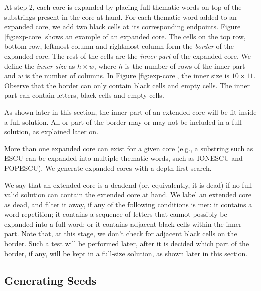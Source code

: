 At step 2, each core is expanded by placing full thematic words on top of the substrings present in the core at hand.
For each thematic word added to an expanded core, we add two black cells at its corresponding endpoints.
Figure \ref{fig:exp-core} shows an example of an expanded core. 
The cells on the top row, bottom row, leftmost column and rightmost column form the \emph{border} of the expanded core. The rest of the cells are the \emph{inner part} of the expanded core.
We define the \emph{inner size} as $h \times w$, where $h$ is the number of rows
of the inner part and $w$ is the number of columns.
In Figure \ref{fig:exp-core}, the inner size is $10 \times 11$.
Observe that the border can only contain black cells and empty cells.
The inner part can contain letters, black cells and empty cells.

As shown later in this section, the inner part of an extended core will be fit inside a full solution.
All or part of the border may or may not be included in a full solution, as explained later on.

More than one expanded core can exist for a given core (e.g., a substring such as ESCU can be expanded into multiple thematic words, such as IONESCU and POPESCU).
We generate expanded cores with a depth-first search.

We say that an extended core is a deadend (or, equivalently, it is dead) if no full valid solution can contain the extended core at hand. We label an extended core as dead, and filter it away, if any of the
following conditions is met:
it contains a word repetition; it contains a sequence of letters that cannot
possibly be expanded into a full word; or it contains adjacent black cells within the inner part.
Note that, at this stage, we don't check for adjacent black cells on the border.
Such a test will be performed later, after it is decided which part of the
border, if any, will be kept in a full-size solution, as shown later in this section.


\subsection{Generating Seeds}

